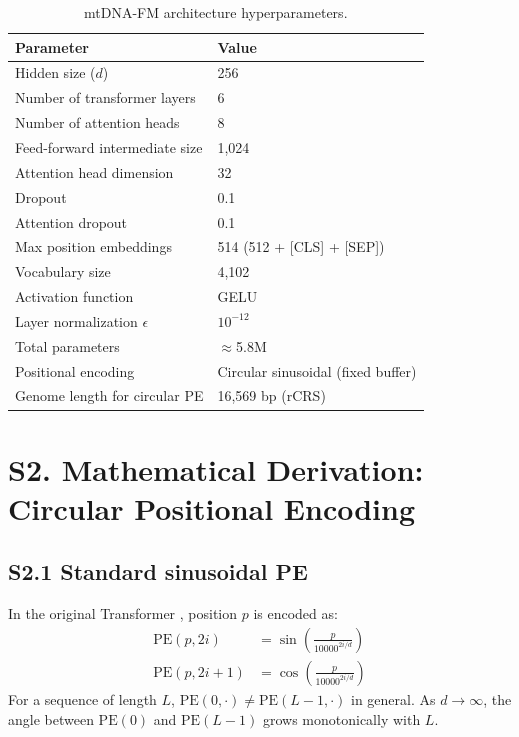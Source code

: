 \documentclass[10pt]{article}
\begin{document}
\begin{table}[h]
\centering
\caption{mtDNA-FM architecture hyperparameters.}
\begin{tabular}{ll}
\toprule
\textbf{Parameter} & \textbf{Value} \\
\midrule
Hidden size ($d$) & 256 \\
Number of transformer layers & 6 \\
Number of attention heads & 8 \\
Feed-forward intermediate size & 1,024 \\
Attention head dimension & 32 \\
Dropout & 0.1 \\
Attention dropout & 0.1 \\
Max position embeddings & 514 (512 + [CLS] + [SEP]) \\
Vocabulary size & 4,102 \\
Activation function & GELU \\
Layer normalization $\epsilon$ & $10^{-12}$ \\
Total parameters & $\approx$5.8M \\
Positional encoding & Circular sinusoidal (fixed buffer) \\
Genome length for circular PE & 16,569 bp (rCRS) \\
\bottomrule
\end{tabular}
\end{table}


\section*{S2. Mathematical Derivation: Circular Positional Encoding}

\subsection*{S2.1 Standard sinusoidal PE}

In the original Transformer \citep{vaswani2017attention}, position $p$ is encoded as:
\begin{align}
\text{PE}(p, 2i) &= \sin\!\left(\frac{p}{10000^{2i/d}}\right) \\
\text{PE}(p, 2i+1) &= \cos\!\left(\frac{p}{10000^{2i/d}}\right)
\end{align}
For a sequence of length $L$, $\text{PE}(0, \cdot) \ne \text{PE}(L-1, \cdot)$ in general.
As $d \to \infty$, the angle between $\text{PE}(0)$ and $\text{PE}(L-1)$ grows monotonically
with $L$.
\end{document}
